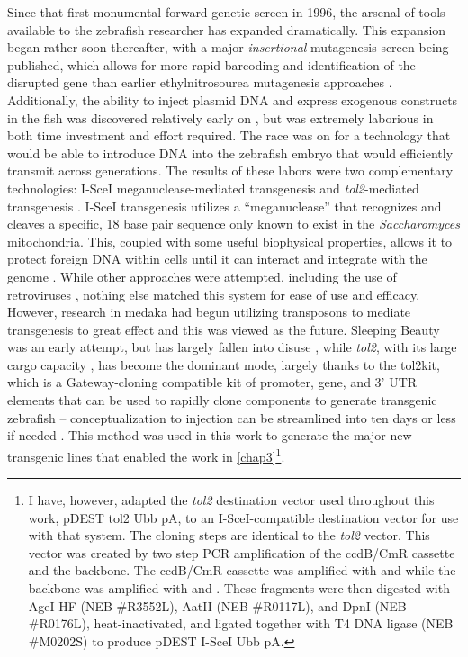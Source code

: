 Since that first monumental forward genetic screen in 1996, the arsenal of tools available to the zebrafish researcher has expanded dramatically. This expansion began rather soon thereafter, with a major \textit{insertional} mutagenesis screen being published, which allows for more rapid barcoding and identification of the disrupted gene than earlier ethylnitrosourea mutagenesis approaches \citep{Amsterdam1999}. Additionally, the ability to inject plasmid DNA and express exogenous constructs in the fish was discovered relatively early on \citep{Stuart1988, Lele1996}, but was extremely laborious in both time investment and effort required. The race was on for a technology that would be able to introduce DNA into the zebrafish embryo that would efficiently transmit across generations. The results of these labors were two complementary technologies: I\hyp{}SceI meganuclease\hyp{}mediated transgenesis \citep{Thermes2002} and \textit{tol2}\hyp{}mediated transgenesis \citep{Kwan2007}. I\hyp{}SceI transgenesis utilizes a ``meganuclease'' that recognizes and cleaves a specific, 18 base pair sequence only known to exist in the \textit{Saccharomyces} mitochondria. This, coupled with some useful biophysical properties, allows it to protect foreign DNA within cells until it can interact and integrate with the genome \citep{Grabher2004, Soroldoni2009}. While other approaches were attempted, including the use of retroviruses \citep{Kurita2004}, nothing else matched this system for ease of use and efficacy. However, research in medaka had begun utilizing transposons to mediate transgenesis to great effect and this was viewed as the future. Sleeping Beauty was an early attempt, but has largely fallen into disuse \citep{Davidson2003}, while \textit{tol2}, with its large cargo capacity \citep{Balciunas2006}, has become the dominant mode, largely thanks to the tol2kit, which is a Gateway\hyp{}cloning compatible kit of promoter, gene, and 3' UTR elements that can be used to rapidly clone components to generate transgenic zebrafish -- conceptualization to injection can be streamlined into ten days or less if needed \citep{Kwan2007}. This method was used in this work to generate the major new transgenic lines that enabled the work in \autoref{chap3}\footnote{I have, however, adapted the \textit{tol2} destination vector used throughout this work, pDEST tol2 Ubb pA, to an I\hyp{}SceI\hyp{}compatible destination vector for use with that system. The cloning steps are identical to the \textit{tol2} vector. This vector was created by two step PCR amplification of the ccdB/CmR cassette and the backbone. The ccdB/CmR cassette was amplified with  and  while the backbone was amplified with  and . These fragments were then digested with AgeI\hyp{}HF (NEB \#R3552L), AatII (NEB \#R0117L), and DpnI (NEB \#R0176L), heat\hyp{}inactivated, and ligated together with T4 DNA ligase (NEB \#M0202S) to produce pDEST I\hyp{}SceI Ubb pA.}.

